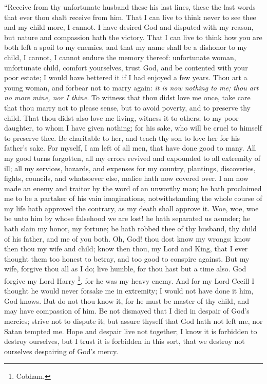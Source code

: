 ``Receive from thy unfortunate
husband these his last lines, these the last words that ever thou shalt
receive from him. That I can live to think never to see thee and my
child more, I cannot. I have desired God and disputed with my reason,
but nature and compassion hath the victory. That I can live to think how
you are both left a spoil to my enemies, and that my name shall be a
dishonor to my child, I cannot, I cannot endure the memory thereof:
unfortunate woman, unfortunate child, comfort yourselves, trust God, and
be contented with your poor estate; I would have bettered it if I had
enjoyed a few years. Thou art a young woman, and forbear not to marry
again: \emph{it is now nothing to me; thou art no more mine, nor I thine}.
To witness that thou didst love me once, take care that thou marry not
to please sense, but to avoid poverty, and to preserve thy child. That
thou didst also love me living, witness it to others; to my poor
daughter, to whom I have given nothing; for his sake, who will be cruel
to himself to preserve thee. Be charitable to her, and teach thy son to
love her for his father's sake. For myself, I am left of all men, that
have done good to many. All my good turns forgotten, all my errors
revived and expounded to all extremity of ill; all my services, hazards,
and expenses for my country, plantings, discoveries, fights, councils,
and whatsoever else, malice hath now covered over. I am now made an
enemy and traitor by the word of an unworthy man; he hath proclaimed me
to be a partaker of his vain imaginations, notwithstanding the whole
course of my life hath approved the contrary, as my death shall approve
it. Woe, woe, woe be unto him by whose
falsehood we are lost! he hath separated us asunder; he hath slain my
honor, my fortune; be hath robbed thee of thy husband, thy child of his
father, and me of you both. Oh, God! thou dost know my wrongs: know then
thou my wife and child; know then thou, my Lord and King, that I ever
thought them too honest to betray, and too good to conspire against. But
my wife, forgive thou all as I do; live humble, for thou hast but a time
also. God forgive my Lord Harry \footnote{Cobham.}, for he was my heavy enemy. And for my Lord Cecill
I thought he would never forsake me in extremity; I would not have done
it him, God knows. But do not thou know it, for he must be master of thy
child, and may have compassion of him. Be not dismayed that I died in
despair of God's mercies; strive not to dispute it; but assure thyself
that God hath not left me, nor Satan tempted me. Hope and despair live
not together; I know it is forbidden to destroy ourselves, but I trust
it is forbidden in this sort, that we destroy not ourselves despairing
of God's mercy.

